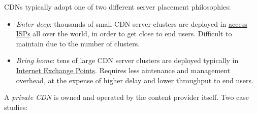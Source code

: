 \documentclass[8pt, table, xcdraw]{article}%
\begin{document}
CDNs typically adopt one of two different server placement philosophies:

\begin{itemize}
    \item \emph{Enter deep}: thousands of small CDN server clusters are deployed in \hyperref[ISPs]{access ISPs} all over the world, in order to get close to end users. Difficult to maintain due to the number of clusters.
    \item \emph{Bring home}: tens of large CDN server clusters are deployed typically in \hyperref[IXPs]{Internet Exchange Points}. Requires less aintenance and management overhead, at the expense of higher delay and lower throughput to end users.
\end{itemize}

A \emph{private CDN} is owned and operated by the content provider itself. Two case studies:
\end{document}
